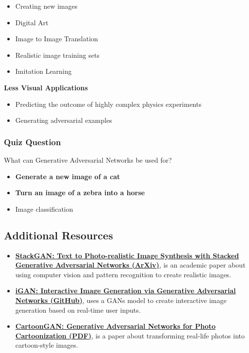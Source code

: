 \begin{itemize}
    \item Creating new images
    \item Digital Art
    \item Image to Image Translation
    \item Realistic image training sets
    \item Imitation Learning
\end{itemize}
\textbf{Less Visual Applications}
\begin{itemize}
    \item Predicting the outcome of highly complex physics experiments
    \item Generating adversarial examples
\end{itemize}

\subsubsection{Quiz Question}

What can Generative Adversarial Networks be used for?
\begin{itemize}
    \item \textbf{Generate a new image of a cat}
    \item \textbf{Turn an image of a zebra into a horse}
    \item Image classification
\end{itemize}

\subsection{Additional Resources}

\begin{itemize}
    \item \href{https://arxiv.org/abs/1612.03242}{\textbf{StackGAN: Text to Photo-realistic Image Synthesis with Stacked Generative Adversarial Networks (ArXiv)}}, is an academic paper about using computer vision and pattern recognition to create realistic images.
    \item \href{https://github.com/junyanz/iGAN}{\textbf{iGAN: Interactive Image Generation via Generative Adversarial Networks (GitHub)}}, uses a GANs model to create interactive image generation based on real-time user inputs.
    \item \href{https://video.udacity-data.com/topher/2018/November/5bea23cd_cartoongan/cartoongan.pdf}{\textbf{CartoonGAN: Generative Adversarial Networks for Photo Cartoonization (PDF)}}, is a paper about transforming real-life photos into cartoon-style images.
\end{itemize}

